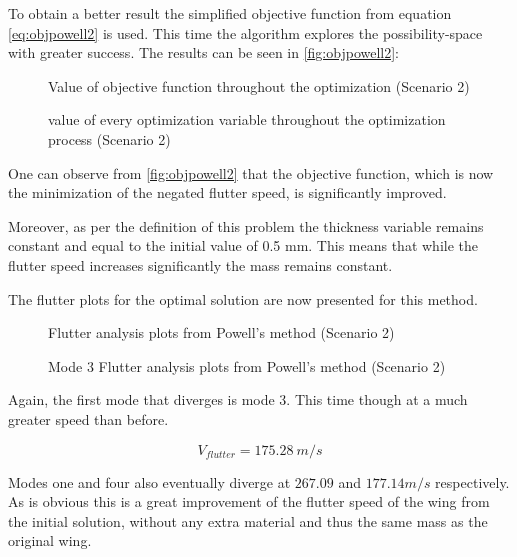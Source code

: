 To obtain a better result the simplified objective function from
equation \eqref{eq:objpowell2} is used. This time the algorithm explores the possibility-space with greater success. The results can be seen in \autoref{fig:objpowell2}:

\begin{figure}[H]
    \centering
    
    \caption{Value of objective function throughout the optimization (Scenario 2)}
    \label{fig:objpowell2}
\end{figure}

\begin{figure}[H]
  \centering
  
  \caption{value of every optimization variable throughout the optimization process (Scenario 2)}
\end{figure}

One can observe from \autoref{fig:objpowell2} that the objective function, which is now the minimization of the negated flutter speed, is significantly improved.

Moreover, as per the definition of this problem the thickness variable remains constant and equal to the initial value of 0.5 mm. This means that while the flutter speed increases significantly the mass remains
constant.

The flutter plots for the optimal solution are now presented for this
method.

\begin{figure}[H]
    \centering
    
    \caption{Flutter analysis plots from Powell's method (Scenario 2)}
\end{figure}


\begin{figure}[H]
    \centering
    
    \caption{Mode 3 Flutter analysis plots from Powell's method (Scenario 2)}
\end{figure}

Again, the first mode that diverges is mode 3. This time though at a much greater speed than before.

\begin{equation}
V_{flutter} = 175.28\ m/s
\end{equation}

Modes one and four also eventually diverge at $267.09$ and $177.14 m/s$ respectively. As is obvious this is a great improvement of the flutter speed of the wing from the initial solution, without any extra material and thus the same mass as the original wing.

